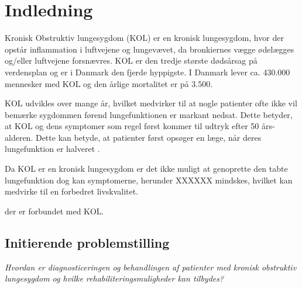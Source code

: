 \chapter{Indledning}
Kronisk Obstruktiv lungesygdom (KOL) er en kronisk lungesygdom, hvor der opstår inflammation i luftvejene og lungevævet, da bronkiernes vægge ødelægges og/eller luftvejene forsnævres. KOL er den tredje største dødsårsag på verdensplan og er i Danmark den fjerde hyppigste. I Danmark lever ca. 430.000 mennesker med KOL og den årlige mortalitet er på 3.500. 

KOL udvikles over mange år, hvilket medvirker til at nogle patienter ofte ikke vil bemærke sygdommen førend lungefunktionen er markant nedsat. Dette betyder, at KOL og dens symptomer som regel først kommer til udtryk efter 50 års-alderen\cite{Lange2015}. Dette kan betyde, at patienter først opsøger en læge, når deres lungefunktion er halveret \cite{dsam2016}.

Da KOL er en kronisk lungesygdom er det ikke muligt at genoprette den tabte lungefunktion dog kan symptomerne, herunder XXXXXX  mindskes, hvilket kan medvirke til en forbedret livskvalitet.  




 der er forbundet med KOL. 





\section{Initierende problemstilling}
\textit{Hvordan er diagnosticeringen og behandlingen af patienter med kronisk obstruktiv lungesygdom og hvilke rehabiliteringsmuligheder kan tilbydes?}